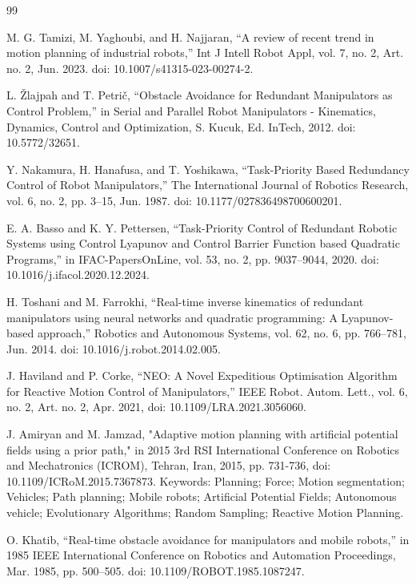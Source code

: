 \documentclass[letterpaper, 10 pt, conference]{ieeeconf}  %
\begin{document}
\begin{thebibliography}{99}
	
 M. G. Tamizi, M. Yaghoubi, and H. Najjaran, “A review of recent trend in motion planning of industrial robots,” Int J Intell Robot Appl, vol. 7, no. 2, Art. no. 2, Jun. 2023. doi: 10.1007/s41315-023-00274-2.

 L. Žlajpah and T. Petrič, “Obstacle Avoidance for Redundant Manipulators as Control Problem,” in Serial and Parallel Robot Manipulators - Kinematics, Dynamics, Control and Optimization, S. Kucuk, Ed. InTech, 2012. doi: 10.5772/32651.

 Y. Nakamura, H. Hanafusa, and T. Yoshikawa, “Task-Priority Based Redundancy Control of Robot Manipulators,” The International Journal of Robotics Research, vol. 6, no. 2, pp. 3–15, Jun. 1987. doi: 10.1177/027836498700600201.

 E. A. Basso and K. Y. Pettersen, “Task-Priority Control of Redundant Robotic Systems using Control Lyapunov and Control Barrier Function based Quadratic Programs,” in IFAC-PapersOnLine, vol. 53, no. 2, pp. 9037–9044, 2020. doi: 10.1016/j.ifacol.2020.12.2024.

 H. Toshani and M. Farrokhi, “Real-time inverse kinematics of redundant manipulators using neural networks and quadratic programming: A Lyapunov-based approach,” Robotics and Autonomous Systems, vol. 62, no. 6, pp. 766–781, Jun. 2014. doi: 10.1016/j.robot.2014.02.005.

 J. Haviland and P. Corke, “NEO: A Novel Expeditious Optimisation Algorithm for Reactive Motion Control of Manipulators,” IEEE Robot. Autom. Lett., vol. 6, no. 2, Art. no. 2, Apr. 2021, doi: 10.1109/LRA.2021.3056060.

 J. Amiryan and M. Jamzad, "Adaptive motion planning with artificial potential fields using a prior path," in 2015 3rd RSI International Conference on Robotics and Mechatronics (ICROM), Tehran, Iran, 2015, pp. 731-736, doi: 10.1109/ICRoM.2015.7367873. Keywords: Planning; Force; Motion segmentation; Vehicles; Path planning; Mobile robots; Artificial Potential Fields; Autonomous vehicle; Evolutionary Algorithms; Random Sampling; Reactive Motion Planning.

 O. Khatib, “Real-time obstacle avoidance for manipulators and mobile robots,” in 1985 IEEE International Conference on Robotics and Automation Proceedings, Mar. 1985, pp. 500–505. doi: 10.1109/ROBOT.1985.1087247.


\end{thebibliography}
\end{document}
